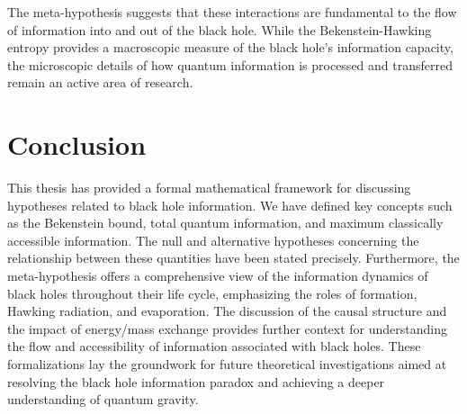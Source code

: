 \documentclass{article}
\theoremstyle{definition}
\begin{document}
	The meta-hypothesis suggests that these interactions are fundamental to the flow of information into and out of the black hole. While the Bekenstein-Hawking entropy provides a macroscopic measure of the black hole's information capacity, the microscopic details of how quantum information is processed and transferred remain an active area of research.
	
	\section{Conclusion}
	
	This thesis has provided a formal mathematical framework for discussing hypotheses related to black hole information. We have defined key concepts such as the Bekenstein bound, total quantum information, and maximum classically accessible information. The null and alternative hypotheses concerning the relationship between these quantities have been stated precisely. Furthermore, the meta-hypothesis offers a comprehensive view of the information dynamics of black holes throughout their life cycle, emphasizing the roles of formation, Hawking radiation, and evaporation. The discussion of the causal structure and the impact of energy/mass exchange provides further context for understanding the flow and accessibility of information associated with black holes. These formalizations lay the groundwork for future theoretical investigations aimed at resolving the black hole information paradox and achieving a deeper understanding of quantum gravity.
	
\end{document}
